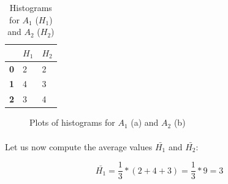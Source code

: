 \begin{table}[H]
    \centering
	\begin{spacing}{1.5}    
    \begin{tabular}{|l|l|l|}
        \hline
        \cellcolor{gray} & \textbf{$H_1$} & \textbf{$H_2$} \\ [0.5ex]
        \hline\hline
        \textbf{0} & 2 & 2 \\ [0.5ex]
        \hline
        \textbf{1} & 4 & 3 \\ [0.5ex]
        \hline
        \textbf{2} & 3 & 4 \\ [0.5ex]
        \hline
    \end{tabular}
    \end{spacing}
    \caption{Histograms for $A_1$ ($H_1$) and $A_2$ ($H_2$)}
    \label{tab:histogram_comparison}
\end{table}

\begin{figure}[H]
     \centering
     \qquad
     \caption{Plots of histograms for $A_1$ (a) and $A_2$ (b)}
     \label{fig:histogram_comparison_plot}
\end{figure}

\paragraph{}
Let us now compute the average values $\bar{H_1}$ and $\bar{H_2}$:

\begin{equation}
	\bar{H_1} = \frac{1}{3} * (2 + 4 + 3) = \frac{1}{3} * 9 = 3
	\label{eq:h_1_avg}
\end{equation}

